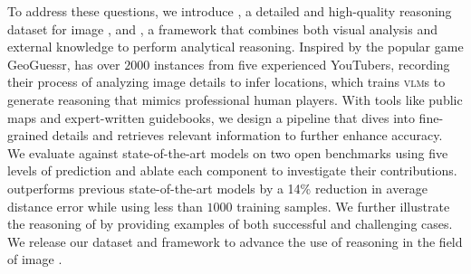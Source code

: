 To address these questions, we introduce \dataname, a detailed and high-quality reasoning dataset for image \geoloc, and \modelname, a framework that combines both visual analysis and external knowledge to perform analytical reasoning. Inspired by the popular game GeoGuessr, \dataname has over $2000$ instances from five experienced YouTubers, recording their process of analyzing image details to infer locations, which trains \textsc{vlm}s to generate reasoning that mimics professional human players. With tools like public maps and expert-written guidebooks, we design a pipeline that dives into fine-grained details and retrieves relevant information to further enhance accuracy. We evaluate \modelname against state-of-the-art models on two open benchmarks using five levels of prediction and ablate each component to investigate their contributions. \modelname outperforms previous state-of-the-art models by a 14\% reduction in average distance error while using less than $1000$ training samples. We further illustrate the reasoning of \modelname by providing examples of both successful and challenging cases. We release our dataset and framework to advance the use of reasoning in the field of image \geoloc.